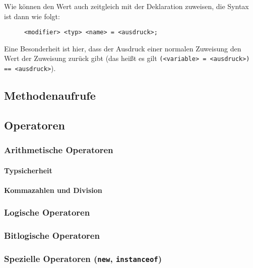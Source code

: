 	Wie können den Wert auch zeitgleich mit der Deklaration zuweisen, die Syntax ist dann wie folgt:
	\begin{figure}[H]
		\centering
		\lstinline|<modifier> <typ> <name> = <ausdruck>;|
	\end{figure}

	Eine Besonderheit ist hier, dass der Ausdruck einer normalen Zuweisung den Wert der Zuweisung zurück gibt (das heißt es gilt \texttt{(<variable> = <ausdruck>) == <ausdruck>}).

\subsection{Methodenaufrufe}

\subsection{Operatoren}
	
	\subsubsection{Arithmetische Operatoren}
		
		\paragraph{Typsicherheit}
		
		\paragraph{Kommazahlen und Division}
	
	\subsubsection{Logische Operatoren}
	
	\subsubsection{Bitlogische Operatoren}
	
	\subsubsection{Spezielle Operatoren (\texttt{new}, \texttt{instanceof})}
	
